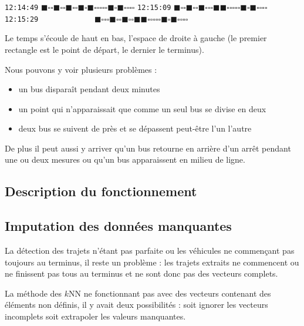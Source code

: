 \documentclass[letterpaper]{article}
\begin{document}
\begin{appendices}
\texttt{12:14:49} $\blacksquare\square\square\blacksquare\square\square\blacksquare\square\square\blacksquare\square\blacksquare\square\square\square\square\square\blacksquare\square\blacksquare\square\square\square\square$
\texttt{12:15:09} $\blacksquare\square\square\blacksquare\square\square\blacksquare\square\square\square\blacksquare\blacksquare\square\square\square\square\square\blacksquare\square\blacksquare\square\square\square\square$
\texttt{12:15:29} ~~~~~~~~~~~~~$\blacksquare\square\square\square\blacksquare\square\square\blacksquare\square\square\blacksquare\blacksquare\square\square\square\square\square\blacksquare\square\blacksquare\square\square\square\square$

Le temps s'écoule de haut en bas, l'espace de droite à gauche (le premier rectangle est le point de départ, le dernier le terminus).

Nous pouvons y voir plusieurs problèmes :
\begin{itemize}
    \item un bus disparaît pendant deux minutes
    \item un point qui n'apparaissait que comme un seul bus se divise en deux
    \item deux bus se suivent de près et se dépassent peut-être l'un l'autre
\end{itemize}

De plus il peut aussi y arriver qu'un bus retourne en arrière d'un arrêt pendant une ou deux mesures ou qu'un bus apparaissent en milieu de ligne.

\subsection{Description du fonctionnement}

\subsection{Imputation des données manquantes}

La détection des trajets n'étant pas parfaite ou les véhicules ne commençant pas toujours au terminus, il reste un problème : les trajets extraits ne commencent ou ne finissent pas tous au terminus et ne sont donc pas des vecteurs complets.

La méthode des $k$NN ne fonctionnant pas avec des vecteurs contenant des éléments non définis, il y avait deux possibilités : soit ignorer les vecteurs incomplets soit extrapoler les valeurs manquantes.


\end{appendices}
\end{document}
